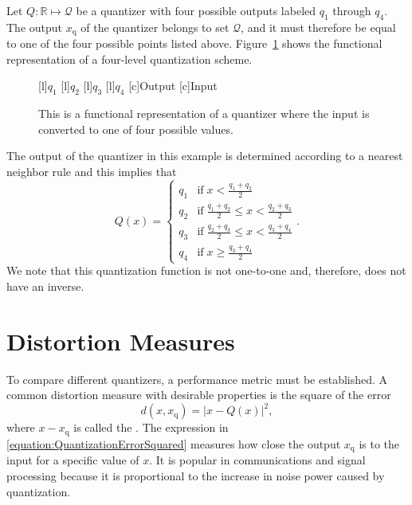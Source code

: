 \begin{example}
Let $Q : \mathbb{R} \mapsto \mathcal{Q}$ be a quantizer with four possible outputs labeled $q_1$ through $q_4$.
The output $x_{\mathrm{q}}$ of the quantizer belongs to set $\mathcal{Q}$, and it must therefore be equal to one of the four possible points listed above.
Figure~\ref{figure:Quantizer} shows the functional representation of a four-level quantization scheme.
\begin{figure}[htbp]
\begin{center}
\begin{psfrags}
[l]{$q_1$}
[l]{$q_2$}
[l]{$q_3$}
[l]{$q_4$}
[c]{Output}
[c]{Input}
\end{psfrags}
\caption{This is a functional representation of a quantizer where the input is converted to one of four possible values.}
\label{figure:Quantizer}
\end{center}
\end{figure}
The output of the quantizer in this example is determined according to a nearest neighbor rule and this implies that
\[ Q(x) =
\begin{cases}
q_1 & \mathrm{if }\; x < \frac{q_1 + q_2}{2} \\
q_2 & \mathrm{if }\; \frac{q_1 + q_2}{2} \leq x < \frac{q_2 + q_3}{2} \\
q_3 & \mathrm{if }\; \frac{q_2 + q_3}{2} \leq x < \frac{q_3 + q_4}{2} \\
q_4 & \mathrm{if }\; x \geq \frac{q_3 + q_4}{2} 
\end{cases}. \]
We note that this quantization function is not one-to-one and, therefore, does not have an inverse.
\end{example}


\section{Distortion Measures}

To compare different quantizers, a performance metric must be established.
A common distortion measure with desirable properties is the square of the error
\begin{equation} \label{equation:QuantizationErrorSquared}
d(x, x_{\mathrm{q}}) = \left|x - Q(x) \right|^2 ,
\end{equation}
where $x - x_{\mathrm{q}}$ is called the .
The expression in \eqref{equation:QuantizationErrorSquared} measures how close the output $x_{\mathrm{q}}$ is to the input for a specific value of $x$.
It is popular in communications and signal processing because it is proportional to the increase in noise power caused by quantization.

